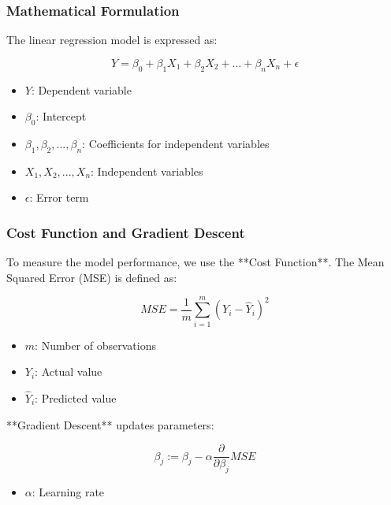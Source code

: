 \documentclass[aspectratio=169]{beamer}
\begin{document}
\begin{frame}[fragile]
    \frametitle{Mathematical Formulation}
    The linear regression model is expressed as:
    
    \begin{equation}
    Y = \beta_0 + \beta_1 X_1 + \beta_2 X_2 + ... + \beta_n X_n + \epsilon
    \end{equation}
    
    \begin{itemize}
        \item \(Y\): Dependent variable
        \item \(\beta_0\): Intercept
        \item \(\beta_1, \beta_2, ..., \beta_n\): Coefficients for independent variables
        \item \(X_1, X_2, ..., X_n\): Independent variables
        \item \(\epsilon\): Error term
    \end{itemize}
\end{frame}

\begin{frame}[fragile]
    \frametitle{Cost Function and Gradient Descent}
    To measure the model performance, we use the **Cost Function**. The Mean Squared Error (MSE) is defined as:
    
    \begin{equation}
    MSE = \frac{1}{m} \sum_{i=1}^{m} (Y_i - \hat{Y}_i)^2
    \end{equation}
    
    \begin{itemize}
        \item \(m\): Number of observations
        \item \(Y_i\): Actual value
        \item \(\hat{Y}_i\): Predicted value
    \end{itemize}

    **Gradient Descent** updates parameters:
    
    \begin{equation}
    \beta_j := \beta_j - \alpha \frac{\partial}{\partial \beta_j} MSE
    \end{equation}
    
    \begin{itemize}
        \item \(\alpha\): Learning rate
    \end{itemize}
\end{frame}
\end{document}

